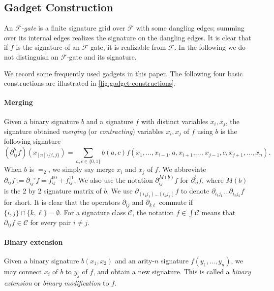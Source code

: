 
\subsection{Gadget Construction}

An \emph{$\mathcal F$-gate} is a finite signature grid over $\mathcal F$
with some dangling edges; summing over its internal edges realizes the
signature on the dangling edges. 
It is clear that if $f$ is the signature of an $\mathcal F$-gate, it is realizable from $\mathcal{F}.$
In the following we do not distinguish an $\mathcal{F}$-gate and its signature.

We record some frequently used gadgets in this paper. 
The following four basic constructions are illustrated in \cref{fig:gadget-constructions}.

\paragraph{Merging}
Given a binary signature $b$ and a signature $f$ with distinct variables $x_i,x_j$, the signature obtained \emph{merging} (or \emph{contracting}) variables $x_i,x_j$ of $f$ using $b$ is the following signature
\[
(\partial_{ij}^b f)(x_{[n]\setminus\{i,j\}})
=\sum_{a,c\in\{0,1\}}b(a,c)
  f(x_1,\ldots,x_{i-1},a,x_{i+1},\ldots,x_{j-1},c,x_{j+1},\ldots,x_n).
\]
When $b$ is $=_2$, we simply say merge $x_i$ and $x_j$ of $f$. 
We abbreviate
$\partial_{ij}f:=\partial_{ij}^{=_2}f=f_{ij}^{00}+f_{ij}^{11}$.
We also use the notation $\partial^{M(b)}_{ij}f$ for $\partial^{b}_{ij}f$, where $M(b)$ is the $2$ by 2 signature matrix of $b$.
We use $\partial_{(i_1j_1)\ldots(i_kj_k)}f$ to denote $\partial_{i_1j_1}\ldots\partial_{i_kj_k}f$ for short.
It is clear that the operators $\partial_{ij}$ and $\partial_{k\ell}$ commute if $\{i,j\}\cap \{k,\ell\}=\emptyset.$
For a signature class $\mathscr C$, the notation
$f\in\int\mathscr C$ means that
$\partial_{ij}f\in\mathscr C$ for every pair $i\ne j$.

\paragraph{Binary extension}
    Given a binary signature $b(x_1,x_2)$ and an arity-$n$ signature $f(y_1,\ldots, y_n)$, we may connect $x_i$ of $b$ to $y_j$ of $f$, and obtain a new signature.
    This is called a \emph{binary extension} or \emph{binary modification} to $f$.



